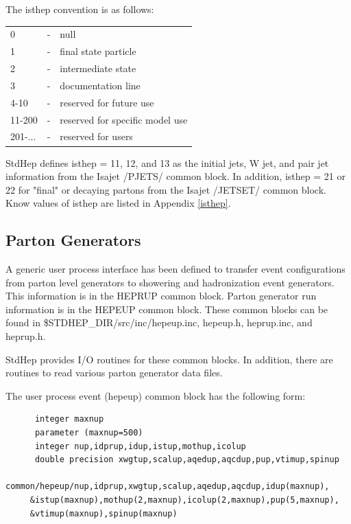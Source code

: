 \noindent The isthep convention is as follows:

\begin{center}
\begin{tabular}{lcl}
 0      &-&null\\
 1      &-&final state particle\\
 2      &-&intermediate state\\
 3      &-&documentation line\\
 4-10   &-&reserved for future use\\
 11-200 &-&reserved for specific model use\\
 201-...&-&reserved for users\\
\end{tabular}
\end{center}

\noindent StdHep defines isthep = 11, 12, and 13 as the initial jets, W jet,
and pair jet information from the Isajet /PJETS/ common block.  In addition,
isthep = 21 or 22 for "final" or decaying partons from the Isajet /JETSET/
common block.  Know values of isthep are listed in Appendix \ref{isthep}.

\subsection { Parton Generators }

A generic user process interface has been defined\cite{leshouches}
to transfer event configurations from parton level generators
to showering and hadronization event generators.  This information is
in the HEPRUP common block.
Parton generator run information is in the HEPEUP common block.
These common blocks can be found in \$STDHEP\_DIR/src/inc/hepeup.inc,
hepeup.h, heprup.inc, and heprup.h.

StdHep provides I/O routines for these common blocks.
In addition, there are routines to read various parton generator data files.

\noindent The user process event (hepeup) common block has the following form:
\begin{verbatim}
      integer maxnup
      parameter (maxnup=500)
      integer nup,idprup,idup,istup,mothup,icolup
      double precision xwgtup,scalup,aqedup,aqcdup,pup,vtimup,spinup
      common/hepeup/nup,idprup,xwgtup,scalup,aqedup,aqcdup,idup(maxnup),
     &istup(maxnup),mothup(2,maxnup),icolup(2,maxnup),pup(5,maxnup),
     &vtimup(maxnup),spinup(maxnup)
\end{verbatim}

